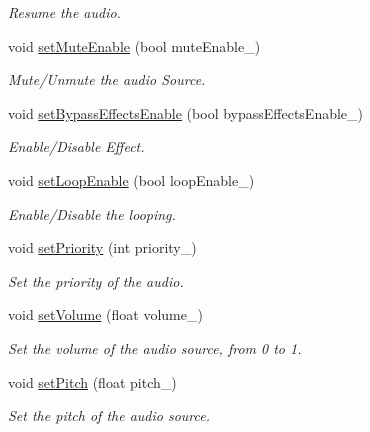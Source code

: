 \begin{DoxyCompactItemize}
\begin{DoxyCompactList}\small\item\em Resume the audio. \end{DoxyCompactList}\item 
void \hyperlink{class_i_dream_sky_1_1_audio_source_base_a5fbb95d5277c3a5e4eb73fb0d7a0edf5}{set\+Mute\+Enable} (bool mute\+Enable\+\_\+)
\begin{DoxyCompactList}\small\item\em Mute/\+Unmute the audio Source. \end{DoxyCompactList}\item 
void \hyperlink{class_i_dream_sky_1_1_audio_source_base_a27f6acecda8f7960b3c79b99e8473ce8}{set\+Bypass\+Effects\+Enable} (bool bypass\+Effects\+Enable\+\_\+)
\begin{DoxyCompactList}\small\item\em Enable/\+Disable Effect. \end{DoxyCompactList}\item 
void \hyperlink{class_i_dream_sky_1_1_audio_source_base_a223d20c8d7d0147479775e38f08872a6}{set\+Loop\+Enable} (bool loop\+Enable\+\_\+)
\begin{DoxyCompactList}\small\item\em Enable/\+Disable the looping. \end{DoxyCompactList}\item 
void \hyperlink{class_i_dream_sky_1_1_audio_source_base_a5030b2f2e0d0000d9a640f17801514c7}{set\+Priority} (int priority\+\_\+)
\begin{DoxyCompactList}\small\item\em Set the priority of the audio. \end{DoxyCompactList}\item 
void \hyperlink{class_i_dream_sky_1_1_audio_source_base_a0115bbd05b13cc7b53a4561adf532782}{set\+Volume} (float volume\+\_\+)
\begin{DoxyCompactList}\small\item\em Set the volume of the audio source, from 0 to 1. \end{DoxyCompactList}\item 
void \hyperlink{class_i_dream_sky_1_1_audio_source_base_ad958e4a0a91d537faca4a9c9f79fe4f4}{set\+Pitch} (float pitch\+\_\+)
\begin{DoxyCompactList}\small\item\em Set the pitch of the audio source. \end{DoxyCompactList}\item 

\end{DoxyCompactItemize}
